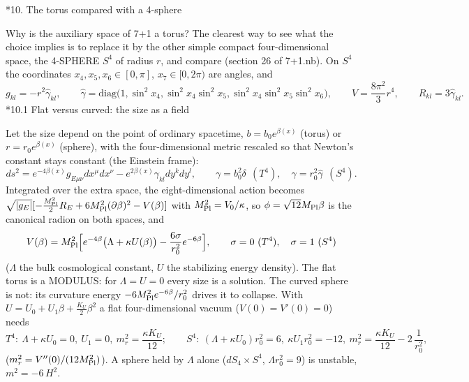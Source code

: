 \documentclass[10pt,a4paper]{article}
\makeatletter
\renewcommand\section{\@startsection{section}{1}{\z@}{-3.5ex \@plus -1ex \@minus -.2ex}{2.3ex \@plus.2ex}{\normalfont\Large\bfseries\raggedright}}
\renewcommand\subsection{\@startsection{subsection}{2}{\z@}{-3.25ex\@plus -1ex \@minus -.2ex}{1.5ex \@plus .2ex}{\normalfont\large\bfseries\raggedright}}
\makeatother
\begin{document}
\section*{10. The torus compared with a 4-sphere}
Why is the auxiliary space of 7+1 a torus? The clearest way to see what the choice implies is to replace it by the other simple compact four-dimensional space, the 4-SPHERE $S^4$ of radius $r$, and compare (section 26 of 7+1.nb). On $S^4$ the coordinates $x_4,x_5,x_6\in[0,\pi]$, $x_7\in[0,2\pi)$ are angles, and
\begin{equation*}
g_{kl}=-r^2\hat\gamma_{kl},\qquad \hat\gamma=\mathrm{diag}\big(1,\sin^2x_4,\sin^2x_4\sin^2x_5,\sin^2x_4\sin^2x_5\sin^2x_6\big),\qquad V=\frac{8\pi^2}3r^4,\qquad R_{kl}=3\hat\gamma_{kl} .
\end{equation*}
\subsection*{10.1 Flat versus curved: the size as a field}
Let the size depend on the point of ordinary spacetime, $b=b_0e^{\beta(x)}$ (torus) or $r=r_0e^{\beta(x)}$ (sphere), with the four-dimensional metric rescaled so that Newton’s constant stays constant (the Einstein frame):
\begin{equation*}
ds^2=e^{-4\beta(x)}g_{E\mu\nu}dx^\mu dx^\nu-e^{2\beta(x)}\gamma_{kl}dy^kdy^l,\qquad \gamma=b_0^2\delta\ \ (T^4),\quad \gamma=r_0^2\hat\gamma\ \ (S^4).
\end{equation*}
Integrated over the extra space, the eight-dimensional action becomes $\sqrt{|g_E|}[-\frac{M_{\rm Pl}^2}2R_E+6M_{\rm Pl}^2(\partial\beta)^2-V(\beta)]$ with $M_{\rm Pl}^2=V_0/\kappa$, so $\phi=\sqrt{12}M_{\rm Pl}\beta$ is the canonical radion on both spaces, and
\begin{equation*}
V(\beta)=M_{\rm Pl}^2\Big[e^{-4\beta}\big(\Lambda+\kappa U(\beta)\big)-\frac{6\sigma}{r_0^2}e^{-6\beta}\Big],\qquad \sigma=0\ (T^4),\quad \sigma=1\ (S^4)
\end{equation*}
($\Lambda$ the bulk cosmological constant, $U$ the stabilizing energy density). The flat torus is a MODULUS: for $\Lambda=U=0$ every size is a solution. The curved sphere is not: its curvature energy $-6M_{\rm Pl}^2e^{-6\beta}/r_0^2$ drives it to collapse. With $U=U_0+U_1\beta+\frac{K_U}2\beta^2$ a flat four-dimensional vacuum ($V(0)=V'(0)=0$) needs
\begin{equation*}
T^4:\ \Lambda+\kappa U_0=0,\ U_1=0,\ m_r^2=\frac{\kappa K_U}{12};\qquad S^4:\ (\Lambda+\kappa U_0)r_0^2=6,\ \kappa U_1r_0^2=-12,\ m_r^2=\frac{\kappa K_U}{12}-2\,\frac1{r_0^2},
\end{equation*}
($m_r^2=V''(0)/(12M_{\rm Pl}^2)$). A sphere held by $\Lambda$ alone ($dS_4\times S^4$, $\Lambda r_0^2=9$) is unstable, $m^2=-6\,H^2$.
\end{document}
